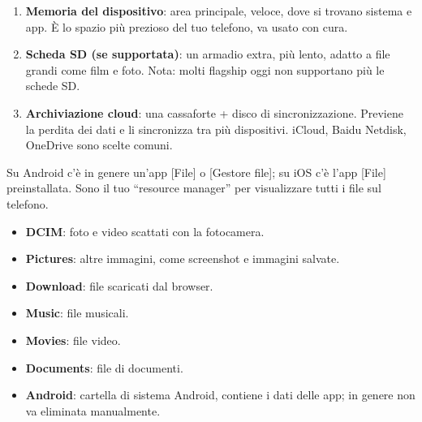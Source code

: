 


\begin{enumerate}
  \item \textbf{Memoria del dispositivo}: area principale, veloce, dove si trovano sistema e app. È lo spazio più prezioso del tuo telefono, va usato con cura.
  \item \textbf{Scheda SD (se supportata)}: un armadio extra, più lento, adatto a file grandi come film e foto. Nota: molti flagship oggi non supportano più le schede SD.
  \item \textbf{Archiviazione cloud}: una cassaforte + disco di sincronizzazione. Previene la perdita dei dati e li sincronizza tra più dispositivi. iCloud, Baidu Netdisk, OneDrive sono scelte comuni.
\end{enumerate}


Su Android c'è in genere un'app [File] o [Gestore file]; su iOS c'è l'app [File] preinstallata. Sono il tuo “resource manager” per visualizzare tutti i file sul telefono.


\begin{itemize}
  \item \textbf{DCIM}: foto e video scattati con la fotocamera.
  \item \textbf{Pictures}: altre immagini, come screenshot e immagini salvate.
  \item \textbf{Download}: file scaricati dal browser.
  \item \textbf{Music}: file musicali.
  \item \textbf{Movies}: file video.
  \item \textbf{Documents}: file di documenti.
  \item \textbf{Android}: cartella di sistema Android, contiene i dati delle app; in genere non va eliminata manualmente.
\end{itemize}

